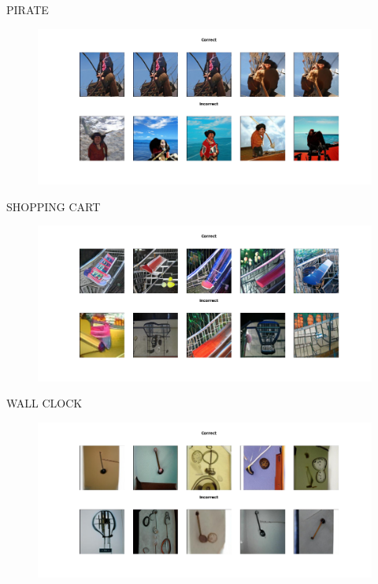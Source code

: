 \documentclass[11pt,a4paper,openany]{book}
\begin{document}
\newline
PIRATE
\begin{figure}[ht!]
    \centering
    \includegraphics[scale=0.4]{figs/imagenet_examples/pirate.png}
\end{figure}
\newpage
\noindent SHOPPING CART
\begin{figure}[ht!]
    \centering
    \includegraphics[scale=0.4]{figs/imagenet_examples/shopping cart.png}
\end{figure}
\newline
WALL CLOCK
\begin{figure}[ht!]
    \centering
    \includegraphics[scale=0.4]{figs/imagenet_examples/wall clock.png}
\end{figure}
\end{document}
